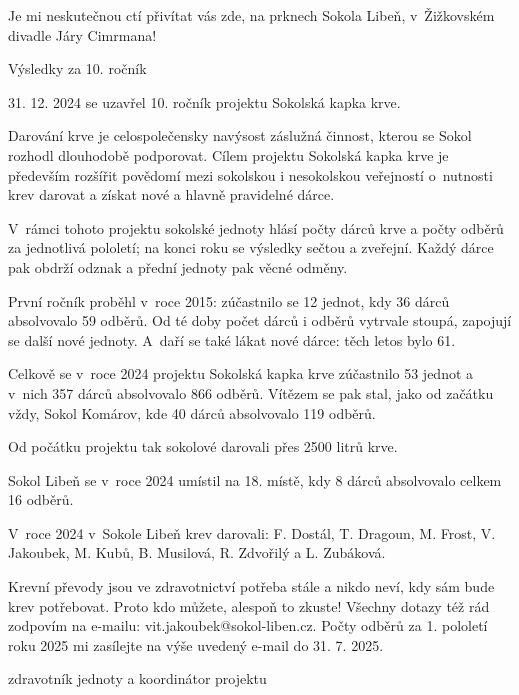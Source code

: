\documentclass[11pt]{article}
\begin{document}
Je mi neskutečnou ctí přivítat vás zde, na prknech Sokola Libeň, v~Žižkovském divadle Járy Cimrmana!

\vspace*{24pt}

Výsledky za 10. ročník

31. 12. 2024 se uzavřel 10. ročník projektu Sokolská kapka krve. 

Darování krve je celospolečensky navýsost záslužná činnost, kterou se Sokol rozhodl dlouhodobě podporovat. Cílem projektu Sokolská kapka krve je především rozšířit povědomí mezi sokolskou i nesokolskou veřejností o~nutnosti krev darovat a získat nové a hlavně pravidelné dárce.

V~rámci tohoto projektu sokolské jednoty hlásí počty dárců krve a počty odběrů za jednotlivá pololetí; na konci roku se výsledky sečtou a zveřejní. Každý dárce pak obdrží odznak a přední jednoty pak věcné odměny. 

První ročník proběhl v~roce 2015: zúčastnilo se 12 jednot, kdy 36 dárců absolvovalo 59 odběrů. Od té doby počet dárců i odběrů vytrvale stoupá, zapojují se další nové jednoty. A~daří se také lákat nové dárce: těch letos bylo 61.

Celkově se v~roce 2024 projektu Sokolská kapka krve zúčastnilo 53 jednot a v~nich 357 dárců absolvovalo 866 odběrů. Vítězem se pak stal, jako od začátku vždy, Sokol Komárov, kde 40 dárců absolvovalo 119 odběrů.

Od počátku projektu tak sokolové darovali přes 2500 litrů krve.

Sokol Libeň se v~roce 2024 umístil na 18. místě, kdy 8 dárců absolvovalo celkem 16 odběrů. 

V~roce 2024 v~Sokole Libeň krev darovali: F. Dostál, T. Dragoun, M. Frost, V. Jakoubek, M. Kubů, B. Musilová, R. Zdvořilý a L. Zubáková.

{\sloppy
Krevní převody jsou ve zdravotnictví potřeba stále a nikdo neví, kdy sám bude krev potřebovat. Proto kdo můžete, alespoň to zkuste! Všechny dotazy též rád zodpovím na e-mailu: vit.jakoubek@sokol-liben.cz. Počty odběrů za 1. pololetí roku 2025 mi zasílejte na výše uvedený e-mail do 31. 7. 2025.}

\signature{Vít Jakoubek}{zdravotník jednoty a koordinátor projektu}
\vspace*{24pt}

\clearpage

\pagestyle{blank}
\end{document}

